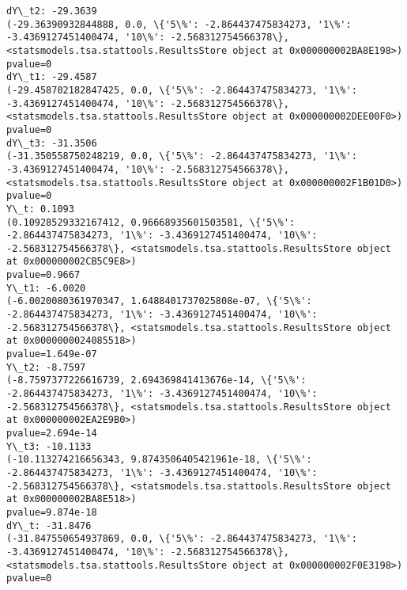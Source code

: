 \documentclass{article}
\begin{document}
    \begin{Verbatim}[commandchars=\\\{\}]
dY\_t2: -29.3639
(-29.36390932844888, 0.0, \{'5\%': -2.864437475834273, '1\%': -3.4369127451400474, '10\%': -2.568312754566378\}, <statsmodels.tsa.stattools.ResultsStore object at 0x000000002BA8E198>)
pvalue=0
dY\_t1: -29.4587
(-29.458702182847425, 0.0, \{'5\%': -2.864437475834273, '1\%': -3.4369127451400474, '10\%': -2.568312754566378\}, <statsmodels.tsa.stattools.ResultsStore object at 0x000000002DEE00F0>)
pvalue=0
dY\_t3: -31.3506
(-31.350558750248219, 0.0, \{'5\%': -2.864437475834273, '1\%': -3.4369127451400474, '10\%': -2.568312754566378\}, <statsmodels.tsa.stattools.ResultsStore object at 0x000000002F1B01D0>)
pvalue=0
Y\_t: 0.1093
(0.10928529332167412, 0.96668935601503581, \{'5\%': -2.864437475834273, '1\%': -3.4369127451400474, '10\%': -2.568312754566378\}, <statsmodels.tsa.stattools.ResultsStore object at 0x000000002CB5C9E8>)
pvalue=0.9667
Y\_t1: -6.0020
(-6.0020080361970347, 1.6488401737025808e-07, \{'5\%': -2.864437475834273, '1\%': -3.4369127451400474, '10\%': -2.568312754566378\}, <statsmodels.tsa.stattools.ResultsStore object at 0x0000000024085518>)
pvalue=1.649e-07
Y\_t2: -8.7597
(-8.7597377226616739, 2.694369841413676e-14, \{'5\%': -2.864437475834273, '1\%': -3.4369127451400474, '10\%': -2.568312754566378\}, <statsmodels.tsa.stattools.ResultsStore object at 0x000000002EA2E9B0>)
pvalue=2.694e-14
Y\_t3: -10.1133
(-10.113274216656343, 9.8743506405421961e-18, \{'5\%': -2.864437475834273, '1\%': -3.4369127451400474, '10\%': -2.568312754566378\}, <statsmodels.tsa.stattools.ResultsStore object at 0x000000002BA8E518>)
pvalue=9.874e-18
dY\_t: -31.8476
(-31.847550654937869, 0.0, \{'5\%': -2.864437475834273, '1\%': -3.4369127451400474, '10\%': -2.568312754566378\}, <statsmodels.tsa.stattools.ResultsStore object at 0x000000002F0E3198>)
pvalue=0
    \end{Verbatim}
\end{document}
